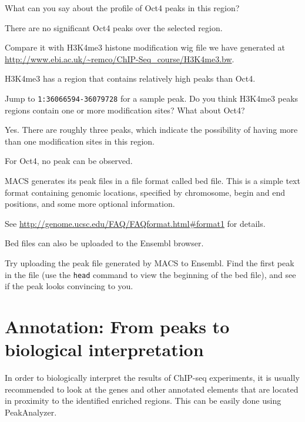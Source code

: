 \begin{questions}
What can you say about the profile of Oct4 peaks in this region? 
\begin{answer}
There are no significant Oct4 peaks over the selected region.
\end{answer}

Compare it with H3K4me3 histone modification wig file we have generated at 
\url{http://www.ebi.ac.uk/~remco/ChIP-Seq_course/H3K4me3.bw}. 
\begin{answer}
H3K4me3 has a region that contains relatively high peaks than Oct4. 
\end{answer}

Jump to \texttt{1:36066594-36079728} for a sample peak. Do you think H3K4me3
peaks regions contain one or more modification sites? What about Oct4?
\begin{answer}
Yes. There are roughly three peaks, which indicate the possibility of having more than one modification sites in this region. 

For Oct4, no peak can be observed.
\end{answer}

\end{questions}

\begin{note}
MACS generates its peak files in a file format called bed file. This is a simple
text format containing genomic locations, specified by chromosome, begin and end
positions, and some more optional information.

See \url{http://genome.ucsc.edu/FAQ/FAQformat.html#format1} for details.

Bed files can also be uploaded to the Ensembl browser.
\end{note}

\begin{advanced}
Try uploading the peak file generated by MACS to Ensembl. Find the first peak in
the file (use the \texttt{head} command to view the beginning of the bed file), and see
if the peak looks convincing to you.
\end{advanced}


\section{Annotation: From peaks to biological interpretation}

\begin{information}
In order to biologically interpret the results of ChIP-seq experiments, it is
usually recommended to look at the genes and other annotated elements that are
located in proximity to the identified enriched regions. This can be easily done
using PeakAnalyzer.
\end{information}


